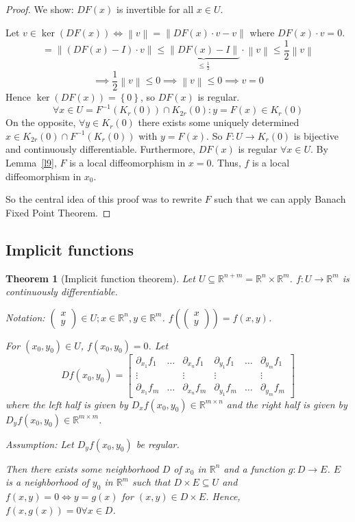 \documentclass{article}
\newtheorem{theorem}{Theorem}  \numberwithin{theorem}{section}
\newcommand{\set}[1]{\left\{#1\right\}}
\newcommand{\norm}[1]{\left\|#1\right\|}
\newcommand{\vectwo}[2]{\begin{pmatrix} #1 \\ #2 \end{pmatrix}}
\begin{document}
\begin{proof}
  We show: $DF(x)$ is invertible for all $x \in U$.
  
  Let $v \in \ker(DF(x)) \iff \norm v = \norm{DF(x) \cdot v - v}$ where $DF(x) \cdot v = 0$.
  \[ = \norm{(DF(x) - I) \cdot v} \leq \underbrace{\norm{DF(x) - I}}_{\leq \frac12} \cdot \norm v \leq \frac12 \norm v \]
  \[ \implies \frac12 \norm v \leq 0 \implies \norm v \leq 0 \implies v = 0 \]
  Hence $\ker(DF(x)) = \set{0}$, so $DF(x)$ is regular.
  \[ \forall x \in U = F^{-1}(K_r(0)) \cap K_{2r}(0): y = F(x) \in K_r(0) \]
  On the opposite, $\forall y \in K_r(0)$ there exists some uniquely determined $x \in K_{2r}(0) \cap F^{-1}(K_r(0))$ with $y = F(x)$.
  So $F: U \to K_r(0)$ is bijective and continuously differentiable. Furthermore, $DF(x)$ is regular $\forall x \in U$.
  By Lemma~\ref{l9}, $F$ is a local diffeomorphism in $x = 0$.
  Thus, $f$ is a local diffeomorphism in $x_0$.
  
  So the central idea of this proof was to rewrite $F$ such that we can apply Banach Fixed Point Theorem.
\end{proof}

\subsection{Implicit functions}
\begin{theorem}[Implicit function theorem] %
  Let $U \subseteq \mathbb R^{n + m} = \mathbb R^n \times \mathbb R^m$.
  $f: U \to \mathbb R^m$ is continuously differentiable.

  \emph{Notation:} $\vectwo xy \in U; x \in \mathbb R^n, y \in \mathbb R^m$. $f\left(\vectwo xy\right) = f(x, y)$.
  
  For $(x_0, y_0) \in U$, $f(x_0, y_0) = 0$.
  Let
  \[
    Df(x_0, y_0) = \begin{bmatrix}
      \partial_{x_1} f_1 & \dots & \partial_{x_n} f_1 & \partial_{y_1} f_1 & \dots & \partial_{y_m} f_1 \\
      \vdots & & \vdots & \vdots & & \vdots \\
      \partial_{x_1} f_m & \dots & \partial_{x_n} f_m & \partial_{y_1} f_m & \dots & \partial_{y_m} f_m
    \end{bmatrix}
  \]
  where the left half is given by $D_x f(x_0, y_0) \in \mathbb R^{m \times n}$ and the right half is given by $D_y f(x_0, y_0) \in \mathbb R^{m \times m}$.
  
  Assumption: Let $D_y f(x_0, y_0)$ be regular.
  
  Then there exists some neighborhood $D$ of $x_0$ in $\mathbb R^n$ and a function $g: D \to E$.
  $E$ is a neighborhood of $y_0$ in $\mathbb R^m$ such that $D \times E \subseteq U$ and $f(x,y) = 0 \iff y = g(x)$ for $(x, y) \in D \times E$.
  Hence, $f(x, g(x)) = 0 \forall x \in D$.
\end{theorem}
\end{document}
